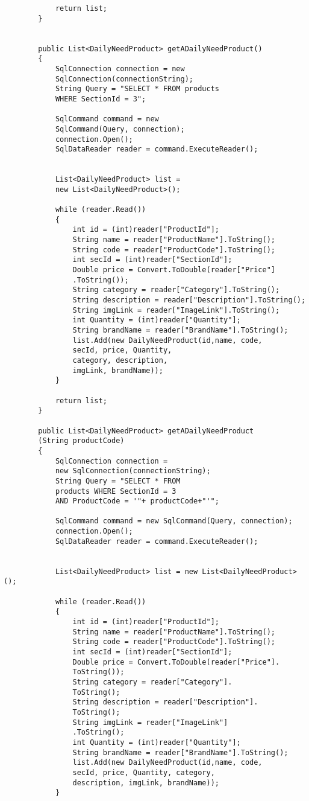 \begin{lstlisting}
            return list;
        }


        public List<DailyNeedProduct> getADailyNeedProduct()
        {
            SqlConnection connection = new 
            SqlConnection(connectionString);
            String Query = "SELECT * FROM products 
            WHERE SectionId = 3";

            SqlCommand command = new 
            SqlCommand(Query, connection);
            connection.Open();
            SqlDataReader reader = command.ExecuteReader();


            List<DailyNeedProduct> list = 
            new List<DailyNeedProduct>();

            while (reader.Read())
            {
                int id = (int)reader["ProductId"];
                String name = reader["ProductName"].ToString();
                String code = reader["ProductCode"].ToString();
                int secId = (int)reader["SectionId"];
                Double price = Convert.ToDouble(reader["Price"]
                .ToString());
                String category = reader["Category"].ToString();
                String description = reader["Description"].ToString();
                String imgLink = reader["ImageLink"].ToString();
                int Quantity = (int)reader["Quantity"];
                String brandName = reader["BrandName"].ToString();
                list.Add(new DailyNeedProduct(id,name, code,
                secId, price, Quantity, 
                category, description, 
                imgLink, brandName));
            }

            return list;
        }

        public List<DailyNeedProduct> getADailyNeedProduct
        (String productCode)
        {
            SqlConnection connection = 
            new SqlConnection(connectionString);
            String Query = "SELECT * FROM 
            products WHERE SectionId = 3 
            AND ProductCode = '"+ productCode+"'";

            SqlCommand command = new SqlCommand(Query, connection);
            connection.Open();
            SqlDataReader reader = command.ExecuteReader();


            List<DailyNeedProduct> list = new List<DailyNeedProduct>();

            while (reader.Read())
            {
                int id = (int)reader["ProductId"];
                String name = reader["ProductName"].ToString();
                String code = reader["ProductCode"].ToString();
                int secId = (int)reader["SectionId"];
                Double price = Convert.ToDouble(reader["Price"].
                ToString());
                String category = reader["Category"].
                ToString();
                String description = reader["Description"].
                ToString();
                String imgLink = reader["ImageLink"]
                .ToString();
                int Quantity = (int)reader["Quantity"];
                String brandName = reader["BrandName"].ToString();
                list.Add(new DailyNeedProduct(id,name, code,
                secId, price, Quantity, category, 
                description, imgLink, brandName));
            }


\end{lstlisting}
